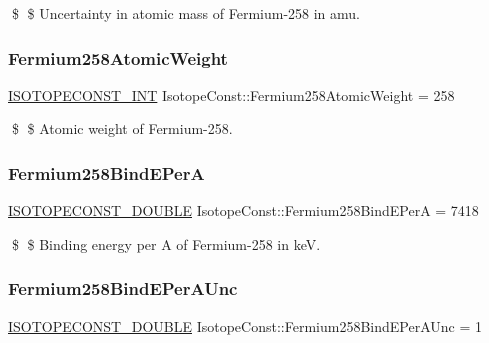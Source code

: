 \$ \$ Uncertainty in atomic mass of Fermium-\/258 in amu. \mbox{\label{group___isotope_const-_fermium-_fm258_gaa660d2d35e9c606021378f595f7ea0ce}} 
\subsubsection{\texorpdfstring{Fermium258\+Atomic\+Weight}{Fermium258AtomicWeight}}
{\footnotesize\ttfamily \mbox{\hyperlink{group___isotope_const-_macros_ga5f18360b3e99483a35c32d789e62621c}{I\+S\+O\+T\+O\+P\+E\+C\+O\+N\+S\+T\+\_\+\+I\+NT}} Isotope\+Const\+::\+Fermium258\+Atomic\+Weight = 258}

\$ \$ Atomic weight of Fermium-\/258. \mbox{\label{group___isotope_const-_fermium-_fm258_gaeed5ce950bc03ba33658a3eff3dd71b1}} 
\subsubsection{\texorpdfstring{Fermium258\+Bind\+E\+PerA}{Fermium258BindEPerA}}
{\footnotesize\ttfamily \mbox{\hyperlink{group___isotope_const-_macros_ga8f45a7272ce02c0b4c65c44636ed719a}{I\+S\+O\+T\+O\+P\+E\+C\+O\+N\+S\+T\+\_\+\+D\+O\+U\+B\+LE}} Isotope\+Const\+::\+Fermium258\+Bind\+E\+PerA = 7418}

\$ \$ Binding energy per A of Fermium-\/258 in keV. \mbox{\label{group___isotope_const-_fermium-_fm258_ga221f289fdff86a2a538171e77956dbe2}} 
\subsubsection{\texorpdfstring{Fermium258\+Bind\+E\+Per\+A\+Unc}{Fermium258BindEPerAUnc}}
{\footnotesize\ttfamily \mbox{\hyperlink{group___isotope_const-_macros_ga8f45a7272ce02c0b4c65c44636ed719a}{I\+S\+O\+T\+O\+P\+E\+C\+O\+N\+S\+T\+\_\+\+D\+O\+U\+B\+LE}} Isotope\+Const\+::\+Fermium258\+Bind\+E\+Per\+A\+Unc = 1}

